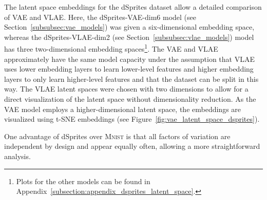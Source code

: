 The latent space embeddings for the dSprites dataset allow a detailed comparison of \ac{VAE} and \ac{VLAE}.
Here, the dSprites-\ac{VAE}-dim6 model (see Section~\ref{subsubsec:vae_models}) was given a six-dimensional embedding space, whereas the dSprites-\ac{VLAE}-dim2 (see Section~\ref{subsubsec:vlae_models}) model has three two-dimensional embedding spaces\footnote{Plots for the other models can be found in Appendix~\ref{subsection:appendix_dsprites_latent_space}.}.
The \ac{VAE} and \ac{VLAE} approximately have the same model capacity under the assumption that \ac{VLAE} uses lower embedding layers to learn lower-level features and higher embedding layers to only learn higher-level features and that the dataset can be split in this way.
The \ac{VLAE} latent spaces were chosen with two dimensions to allow for a direct visualization of the latent space without dimensionality reduction.
As the \ac{VAE} model employs a higher-dimensional latent space, the embeddings are visualized using \ac{t-SNE} embeddings (see Figure~\ref{fig:vae_latent_space_dsprites}).

One advantage of dSprites over \textsc{Mnist} is that all factors of variation are independent by design and appear equally often, allowing a more straightforward analysis.

